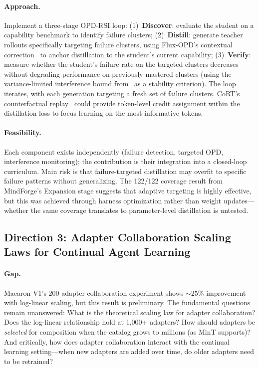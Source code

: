 \documentclass[11pt,a4paper]{article}
\begin{document}
\paragraph{Approach.} Implement a three-stage OPD-RSI loop: (1)~\textbf{Discover}: evaluate the student on a capability benchmark to identify failure clusters; (2)~\textbf{Distill}: generate teacher rollouts specifically targeting failure clusters, using Flux-OPD's contextual correction~\cite{flux2026opd} to anchor distillation to the student's current capability; (3)~\textbf{Verify}: measure whether the student's failure rate on the targeted clusters decreases without degrading performance on previously mastered clusters (using the variance-limited interference bound from~\cite{zhu2026sft} as a stability criterion). The loop iterates, with each generation targeting a fresh set of failure clusters. CoRT's counterfactual replay~\cite{cort2026} could provide token-level credit assignment within the distillation loss to focus learning on the most informative tokens.

\paragraph{Feasibility.} Each component exists independently (failure detection, targeted OPD, interference monitoring); the contribution is their integration into a closed-loop curriculum. Main risk is that failure-targeted distillation may overfit to specific failure patterns without generalizing. The 122/122 coverage result from MindForge's Expansion stage suggests that adaptive targeting is highly effective, but this was achieved through harness optimization rather than weight updates---whether the same coverage translates to parameter-level distillation is untested.

\subsection{Direction 3: Adapter Collaboration Scaling Laws for Continual Agent Learning}

\paragraph{Gap.} Macaron-V1's 200-adapter collaboration experiment shows ${\sim}25\%$ improvement with log-linear scaling, but this result is preliminary. The fundamental questions remain unanswered: What is the theoretical scaling law for adapter collaboration? Does the log-linear relationship hold at 1{,}000+ adapters? How should adapters be \emph{selected} for composition when the catalog grows to millions (as MinT supports)? And critically, how does adapter collaboration interact with the continual learning setting---when new adapters are added over time, do older adapters need to be retrained?
\end{document}
